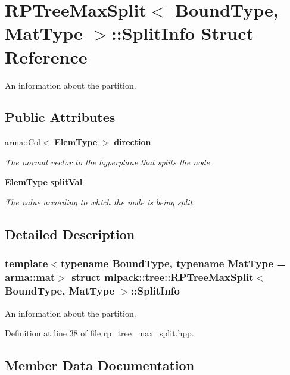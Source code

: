 \section{R\+P\+Tree\+Max\+Split$<$ Bound\+Type, Mat\+Type $>$\+:\+:Split\+Info Struct Reference}
\label{structmlpack_1_1tree_1_1RPTreeMaxSplit_1_1SplitInfo}


An information about the partition.  


\subsection*{Public Attributes}
\begin{DoxyCompactItemize}
\item 
arma\+::\+Col$<$ \textbf{ Elem\+Type} $>$ \textbf{ direction}
\begin{DoxyCompactList}\small\item\em The normal vector to the hyperplane that splits the node. \end{DoxyCompactList}\item 
\textbf{ Elem\+Type} \textbf{ split\+Val}
\begin{DoxyCompactList}\small\item\em The value according to which the node is being split. \end{DoxyCompactList}\end{DoxyCompactItemize}


\subsection{Detailed Description}
\subsubsection*{template$<$typename Bound\+Type, typename Mat\+Type = arma\+::mat$>$\newline
struct mlpack\+::tree\+::\+R\+P\+Tree\+Max\+Split$<$ Bound\+Type, Mat\+Type $>$\+::\+Split\+Info}

An information about the partition. 

Definition at line 38 of file rp\+\_\+tree\+\_\+max\+\_\+split.\+hpp.



\subsection{Member Data Documentation}
\mbox{\label{structmlpack_1_1tree_1_1RPTreeMaxSplit_1_1SplitInfo_a620f4f39e225b65a841f34c53b94515f}} 
